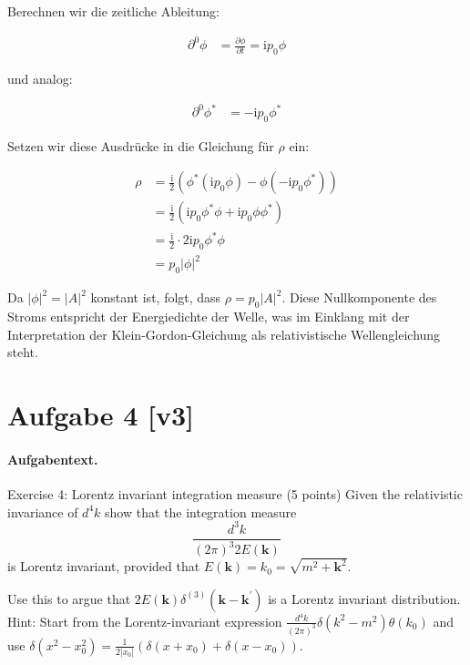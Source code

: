 \documentclass[11pt,a4paper]{article}
\begin{document}
Berechnen wir die zeitliche Ableitung:

\begin{align*}
\partial^0 \phi &= \frac{\partial \phi}{\partial t} = \mathrm{i} p_0 \phi
\end{align*}

und analog:

\begin{align*}
\partial^0 \phi^* &= -\mathrm{i} p_0 \phi^*
\end{align*}

Setzen wir diese Ausdrücke in die Gleichung für $\rho$ ein:

\begin{align*}
\rho &= \frac{\mathrm{i}}{2} \left( \phi^* (\mathrm{i} p_0 \phi) - \phi (-\mathrm{i} p_0 \phi^*) \right) \\
&= \frac{\mathrm{i}}{2} \left( \mathrm{i} p_0 \phi^* \phi + \mathrm{i} p_0 \phi \phi^* \right) \\
&= \frac{\mathrm{i}}{2} \cdot 2 \mathrm{i} p_0 \phi^* \phi \\
&= p_0 |\phi|^2
\end{align*}

Da $|\phi|^2 = |A|^2$ konstant ist, folgt, dass $\rho = p_0 |A|^2$. Diese Nullkomponente des Stroms entspricht der Energiedichte der Welle, was im Einklang mit der Interpretation der Klein-Gordon-Gleichung als relativistische Wellengleichung steht.


\section*{Aufgabe 4 [v3]}
\paragraph{Aufgabentext.}
Exercise 4: Lorentz invariant integration measure (5 points)
Given the relativistic invariance of $d^4 k$ show that the integration measure
$$
\frac{d^3 k}{(2 \pi)^3 2 E(\mathbf{k})}
$$
is Lorentz invariant, provided that $E(\mathbf{k})=k_0=\sqrt{m^2+\mathbf{k}^2}$. 

Use this to argue that $2 E(\mathbf{k}) \delta^{(3)}\left(\mathbf{k}-\mathbf{k}^{\prime}\right)$ is a Lorentz invariant distribution.
Hint: Start from the Lorentz-invariant expression $\frac{d^4 k}{(2 \pi)^3} \delta\left(k^2-m^2\right) \theta\left(k_0\right)$ and use $\delta\left(x^2-x_0^2\right)=\frac{1}{2\left|x_0\right|}\left(\delta\left(x+x_0\right)+\delta\left(x-x_0\right)\right)$.
\end{document}

